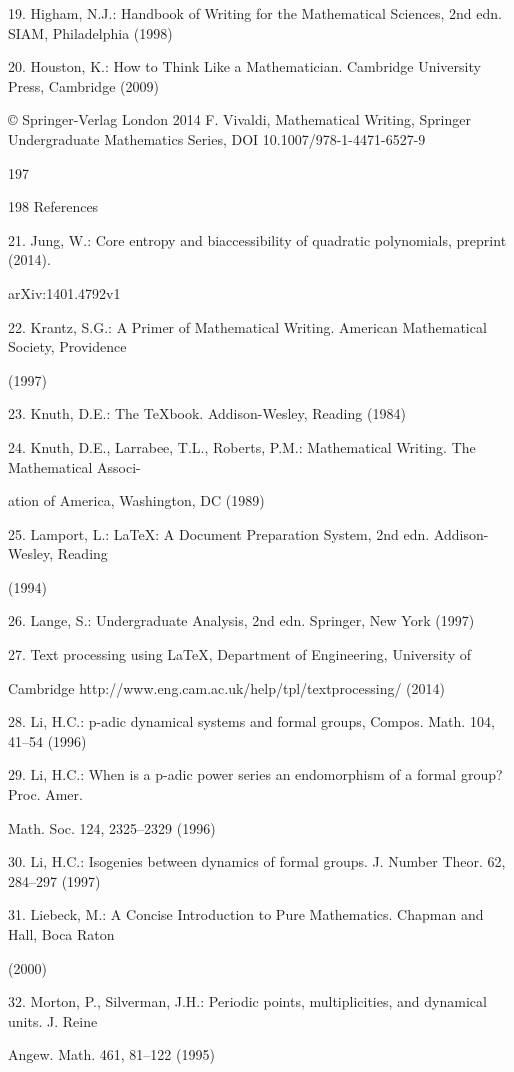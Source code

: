 \documentclass[11pt]{article}
\theoremstyle{plain}
\theoremstyle{definition}
\begin{document}
19. Higham, N.J.: Handbook of Writing for the Mathematical Sciences, 2nd edn. SIAM, Philadelphia (1998)

20. Houston, K.: How to Think Like a Mathematician. Cambridge University Press, Cambridge (2009)

© Springer-Verlag London 2014 F. Vivaldi, Mathematical Writing, Springer Undergraduate Mathematics Series, DOI 10.1007/978-1-4471-6527-9

197

198 References

21. Jung, W.: Core entropy and biaccessibility of quadratic polynomials, preprint (2014).

arXiv:1401.4792v1

22. Krantz, S.G.: A Primer of Mathematical Writing. American Mathematical Society, Providence

(1997)

23. Knuth, D.E.: The TeXbook. Addison-Wesley, Reading (1984)

24. Knuth, D.E., Larrabee, T.L., Roberts, P.M.: Mathematical Writing. The Mathematical Associ-

ation of America, Washington, DC (1989)

25. Lamport, L.: LaTeX: A Document Preparation System, 2nd edn. Addison-Wesley, Reading

(1994)

26. Lange, S.: Undergraduate Analysis, 2nd edn. Springer, New York (1997)

27. Text processing using LaTeX, Department of Engineering, University of

Cambridge http://www.eng.cam.ac.uk/help/tpl/textprocessing/ (2014)

28. Li, H.C.: p-adic dynamical systems and formal groups, Compos. Math. 104, 41--54 (1996)

29. Li, H.C.: When is a p-adic power series an endomorphism of a formal group? Proc. Amer.

Math. Soc. 124, 2325--2329 (1996)

30. Li, H.C.: Isogenies between dynamics of formal groups. J. Number Theor. 62, 284--297 (1997)

31. Liebeck, M.: A Concise Introduction to Pure Mathematics. Chapman and Hall, Boca Raton

(2000)

32. Morton, P., Silverman, J.H.: Periodic points, multiplicities, and dynamical units. J. Reine

Angew. Math. 461, 81--122 (1995)
\end{document}
